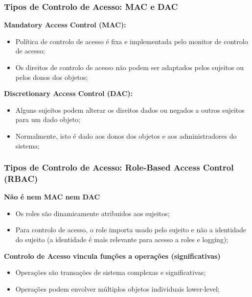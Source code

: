 \documentclass{article}
\begin{document}
\subsubsection{Tipos de Controlo de Acesso: MAC e DAC}

\begin{flushleft}
  \textbf{Mandatory Access Control (MAC):}
  \begin{itemize}
    \item Política de controlo de acesso é fixa e implementada
    pelo monitor de controlo de acesso;
    \item Os direitos de controlo de acesso não podem ser adaptados
    pelos sujeitos ou pelos donos dos objetos;
  \end{itemize}

  \vspace{2mm}

  \textbf{Discretionary Access Control (DAC):}
  \begin{itemize}
    \item Alguns sujeitos podem alterar os direitos dados ou negados
    a outros sujeitos para um dado objeto;
    \item Normalmente, isto é dado aos donos dos objetos e aos
    administradores do sistema;
  \end{itemize}
\end{flushleft}

\subsubsection{Tipos de Controlo de Acesso: Role-Based Access Control (RBAC)}

\begin{flushleft}
  \textbf{Não é nem MAC nem DAC}
  \begin{itemize}
    \item Os roles são dinamicamente atribuidos aos sujeitos;
    \item Para controlo de acesso, o role importa usado pelo sujeito
    e não a identidade do sujeito (a identidade é mais relevante para acesso
    a roles e logging);
  \end{itemize}

  \pagebreak

  \textbf{Controlo de Acesso vincula funções a operações (significativas)}
  \begin{itemize}
    \item Operações são transações de sistema complexas e significativas;
    \item Operações podem envolver múltiplos objetos individuais lower-level;
  \end{itemize}
\end{flushleft}
\end{document}
